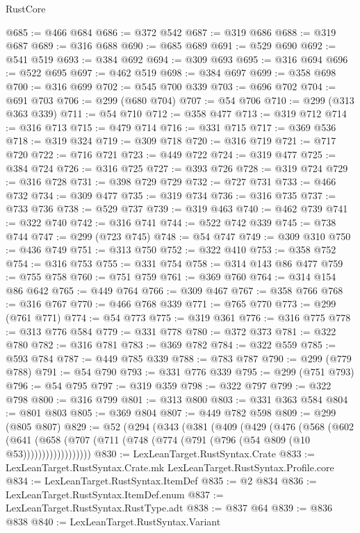\begin{lexlean}{RustCore}
\begin{coremodule}
@685 := @466 @684
@686 := @372 @542
@687 := @319 @686
@688 := @319 @687
@689 := @316 @688
@690 := @685 @689
@691 := @529 @690
@692 := @541 @519
@693 := @384 @692
@694 := @309 @693
@695 := @316 @694
@696 := @522 @695
@697 := @462 @519
@698 := @384 @697
@699 := @358 @698
@700 := @316 @699
@702 := @545 @700 @339
@703 := @696 @702
@704 := @691 @703
@706 := @299 (@680 @704)
@707 := @54 @706
@710 := @299 (@313 @363 @339)
@711 := @54 @710
@712 := @358 @477
@713 := @319 @712
@714 := @316 @713
@715 := @479 @714
@716 := @331 @715
@717 := @369 @536
@718 := @319 @324
@719 := @309 @718
@720 := @316 @719
@721 := @717 @720
@722 := @716 @721
@723 := @449 @722
@724 := @319 @477
@725 := @384 @724
@726 := @316 @725
@727 := @393 @726
@728 := @319 @724
@729 := @316 @728
@731 := @398 @729 @729
@732 := @727 @731
@733 := @466 @732
@734 := @309 @477
@735 := @319 @734
@736 := @316 @735
@737 := @733 @736
@738 := @529 @737
@739 := @319 @463
@740 := @462 @739
@741 := @322 @740
@742 := @316 @741
@744 := @522 @742 @339
@745 := @738 @744
@747 := @299 (@723 @745)
@748 := @54 @747
@749 := @309 @310
@750 := @436 @749
@751 := @313 @750
@752 := @322 @410
@753 := @358 @752
@754 := @316 @753
@755 := @331 @754
@758 := @314 @143 @86 @477
@759 := @755 @758
@760 := @751 @759
@761 := @369 @760
@764 := @314 @154 @86 @642
@765 := @449 @764
@766 := @309 @467
@767 := @358 @766
@768 := @316 @767
@770 := @466 @768 @339
@771 := @765 @770
@773 := @299 (@761 @771)
@774 := @54 @773
@775 := @319 @361
@776 := @316 @775
@778 := @313 @776 @584
@779 := @331 @778
@780 := @372 @373
@781 := @322 @780
@782 := @316 @781
@783 := @369 @782
@784 := @322 @559
@785 := @593 @784
@787 := @449 @785 @339
@788 := @783 @787
@790 := @299 (@779 @788)
@791 := @54 @790
@793 := @331 @776 @339
@795 := @299 (@751 @793)
@796 := @54 @795
@797 := @319 @359
@798 := @322 @797
@799 := @322 @798
@800 := @316 @799
@801 := @313 @800
@803 := @331 @363 @584
@804 := @801 @803
@805 := @369 @804
@807 := @449 @782 @598
@809 := @299 (@805 @807)
@829 := @52
    (@294
      (@343
        (@381
          (@409
            (@429
              (@476
                (@568
                  (@602
                    (@641
                      (@658 (@707 (@711 (@748 (@774 (@791 (@796 (@54 @809 (@10 @53))))))))))))))))))
@830 := LexLeanTarget.RustSyntax.Crate
@833 := LexLeanTarget.RustSyntax.Crate.mk LexLeanTarget.RustSyntax.Profile.core
@834 := LexLeanTarget.RustSyntax.ItemDef
@835 := @2 @834
@836 := LexLeanTarget.RustSyntax.ItemDef.enum
@837 := LexLeanTarget.RustSyntax.RustType.adt
@838 := @837 @64
@839 := @836 @838
@840 := LexLeanTarget.RustSyntax.Variant

\end{coremodule}
\end{lexlean}
